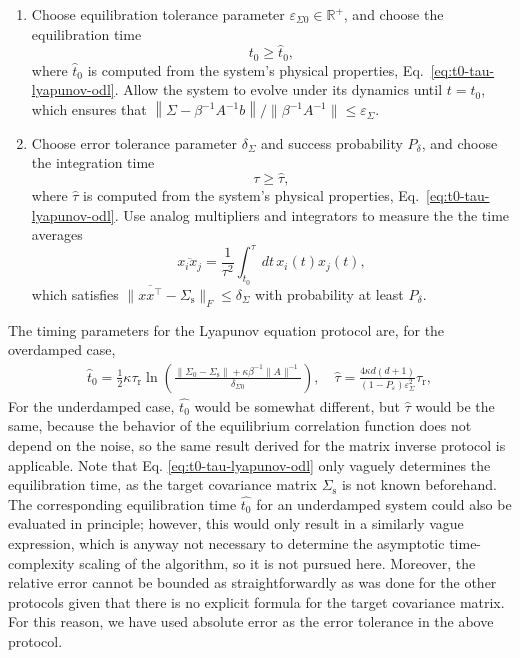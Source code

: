 \documentclass[prx,onecolumn,floatfix,longbibliography,notitlepage, nofootinbib,12pt]{revtex4-2}
\renewcommand{\geq}{\geqslant}
\renewcommand{\leq}{\leqslant}
\begin{document}
\begin{appendix}
\begin{tcolorbox}[title={Lyapunov Equation Protocol},breakable]
\begin{enumerate}
\item Choose equilibration tolerance parameter $\varepsilon_{\Sigma 0} \in \mathbb{R}^+$, and choose the equilibration time
\begin{equation}
\label{eq:UDL-eq-time}
t_0 \geq \widehat{t}_0,
\end{equation}
where $\widehat{t}_0$ is computed from the system's physical properties, Eq.~\eqref{eq:t0-tau-lyapunov-odl}. Allow the system to evolve under its dynamics until $t=t_0$, which ensures that $\left\|\Sigma - \beta^{-1} A^{-1} b\right\|/\|\beta^{-1}A^{-1}\| \leq \varepsilon_\Sigma$.
\item  Choose error tolerance parameter $\delta_\Sigma$ and success probability $P_\delta$, and choose the integration time
\begin{equation}
    \tau \geq \widehat{\tau},
\end{equation}
where $\widehat{\tau}$ is computed from the system's physical properties, Eq.~\eqref{eq:t0-tau-lyapunov-odl}. Use analog multipliers and integrators to measure the the time averages
\begin{equation}
    \overline{x_i x_j} = \frac{1}{\tau^2} \int_{t_0}^\tau dt\, x_i(t) x_j(t),
\end{equation}
which satisfies $\|\overline{x x^\intercal} - \Sigma_\text{s}\|_F \leq \delta_\Sigma$ with probability at least $P_\delta$.
\end{enumerate}
\end{tcolorbox}
\medskip


The timing parameters for the Lyapunov equation protocol are, for the overdamped case,
\begin{align}
\label{eq:t0-tau-lyapunov-odl}
\widehat{t}_0 =
\frac{1}{2}\kappa\tau_\text{r}\ln\left(\frac{\|\Sigma_0 - \Sigma_\text{s}\| + \kappa \beta^{-1} \|A\|^{-1}
}{\delta_{\Sigma 0}}\right),\quad
    \widehat{\tau} = \frac{4 \kappa d(d+1)}{(1-P_\varepsilon)\varepsilon_\Sigma^2}\tau_\text{r},
\end{align}
For the underdamped case, $\widehat{t_0}$ would be somewhat different, but $\widehat{\tau}$ would be the same, because the behavior of the equilibrium correlation function does not depend on the noise, so the same result derived for the matrix inverse protocol is applicable. Note that Eq. \eqref{eq:t0-tau-lyapunov-odl} only vaguely determines the equilibration time, as the target covariance matrix $\Sigma_\text{s}$ is not known beforehand. The corresponding equilibration time $\widehat{t_0}$ for an underdamped system could also be evaluated in principle; however, this would only result in a similarly vague expression, which is anyway not necessary to determine the asymptotic time-complexity scaling of the algorithm, so it is not pursued here. Moreover, the relative error cannot be bounded as straightforwardly as was done for the other protocols given that there is no explicit formula for the target covariance matrix. For this reason, we have used absolute error as the error tolerance in the above protocol.








\end{appendix}
\end{document}

